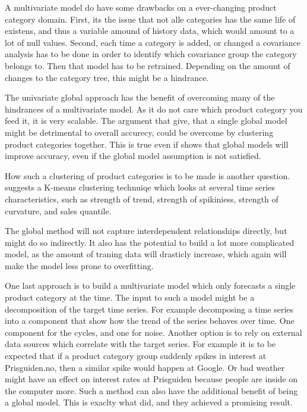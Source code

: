A multivariate model do have some drawbacks on a ever-changing product category domain.
First, its the issue that not alle categories has the same life of existens, and thus a variable
amound of history data, which would amount to a lot of null values.
Second, each time a category is added, or changed a covariance analysis has to be done in order to identify
which covariance group the category belongs to. Then that model has to be retrained.
Depending on the amount of changes to the category tree, this might be a hindrance.

The univariate global approach has the benefit of overcoming many of the hindrances of a multivariate model.
As it do not care which product category you feed it, it is very scalable. The argument that \cite{Bandara2017}
give, that a single global model might be detrimental to overall accurecy, could be overcome by clustering product categories together. This is true even if \cite{Rabanser2020}
shows that global models will improve accuracy, even if the global model assumption is not satisfied.

How such a clustering of product categories is to be made is another question.
\cite{Bandara2017} suggests a K-means clustering technuiqe
which looks at several time series characteristics, such as
strength of trend, strength of spikiniess, strength of curvature,
and sales quantile.

The global method will not capture interdependent relationships directly,
but might do so indirectly. It also has the potential to build a lot more complicated model,
as the amount of traning data will drasticly increase, which again will make the model less prone to
overfitting.

One last approach is to build a multivariate model which only forecasts a single product category at the time.
The input to such a model might be a decomposition of the target time series.
For example decomposing a time series into a component that show how the trend of the series behaves over time.
One component for the cycles, and one for noise.
Another option is to rely on external data sources which correlate with the target series.
For example it is to be expected that if a product category group suddenly spikes in interest at Prisguiden.no,
then a similar spike would happen at Google.
Or bad weather might have an effect on interest rates at Prisguiden because people are inside on the computer more.
Such a method can also have the additional benefit of being a global model.
This is exaclty what \cite{Laptev} did, and they achieved a promising result.

